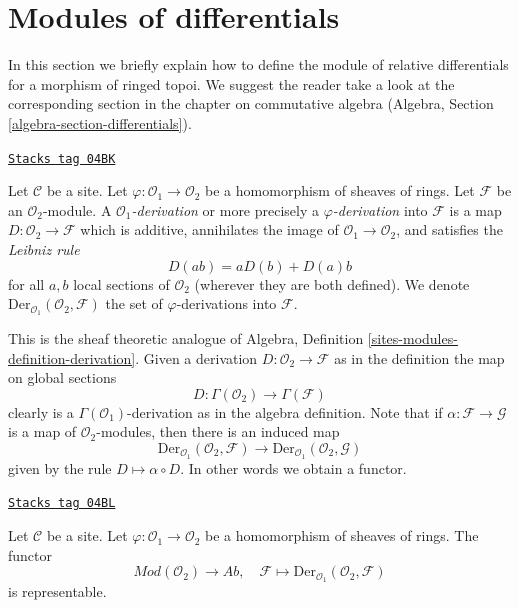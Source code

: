 \section{Modules of differentials}
\label{sites-modules-section-differentials}
In this section we briefly explain how to define the module of relative
differentials for a morphism of ringed topoi.
We suggest the reader take a look at the corresponding section
in the chapter on commutative algebra
(Algebra, Section \ref{algebra-section-differentials}).

\begin{definition}[Derivation]
\label{sites-modules-definition-derivation}
\href{https://stacks.math.columbia.edu/tag/04BK}{\texttt{Stacks tag 04BK}}

Let $\mathcal{C}$ be a site. Let $\varphi : \mathcal{O}_1 \to \mathcal{O}_2$
be a homomorphism of sheaves of rings. Let $\mathcal{F}$
be an $\mathcal{O}_2$-module. A {\it $\mathcal{O}_1$-derivation}
or more precisely a {\it $\varphi$-derivation} into $\mathcal{F}$
is a map $D : \mathcal{O}_2 \to \mathcal{F}$ which is additive, annihilates
the image of $\mathcal{O}_1 \to \mathcal{O}_2$, and satisfies the
{\it Leibniz rule}
$$
D(ab) = aD(b) + D(a)b
$$
for all $a, b$ local sections of $\mathcal{O}_2$
(wherever they are both defined). We denote
$\text{Der}_{\mathcal{O}_1}(\mathcal{O}_2, \mathcal{F})$
the set of $\varphi$-derivations into $\mathcal{F}$.
\end{definition}

This is the sheaf theoretic analogue of
Algebra, Definition \ref{sites-modules-definition-derivation}.
Given a derivation $D : \mathcal{O}_2 \to \mathcal{F}$
as in the definition the map on global sections
$$
D : \Gamma(\mathcal{O}_2) \longrightarrow \Gamma(\mathcal{F})
$$
clearly is a $\Gamma(\mathcal{O}_1)$-derivation as in
the algebra definition. Note that if $\alpha : \mathcal{F} \to \mathcal{G}$
is a map of $\mathcal{O}_2$-modules, then there is an induced map
$$
\text{Der}_{\mathcal{O}_1}(\mathcal{O}_2, \mathcal{F})
\longrightarrow
\text{Der}_{\mathcal{O}_1}(\mathcal{O}_2, \mathcal{G})
$$
given by the rule $D \mapsto \alpha \circ D$. In other words
we obtain a functor.

\begin{lemma}
\label{sites-modules-lemma-universal-module}
\href{https://stacks.math.columbia.edu/tag/04BL}{\texttt{Stacks tag 04BL}}

Let $\mathcal{C}$ be a site. Let $\varphi : \mathcal{O}_1 \to \mathcal{O}_2$
be a homomorphism of sheaves of rings. The functor
$$
\textit{Mod}(\mathcal{O}_2) \longrightarrow \textit{Ab}, \quad
\mathcal{F} \longmapsto \text{Der}_{\mathcal{O}_1}(\mathcal{O}_2, \mathcal{F})
$$
is representable.
\end{lemma}

